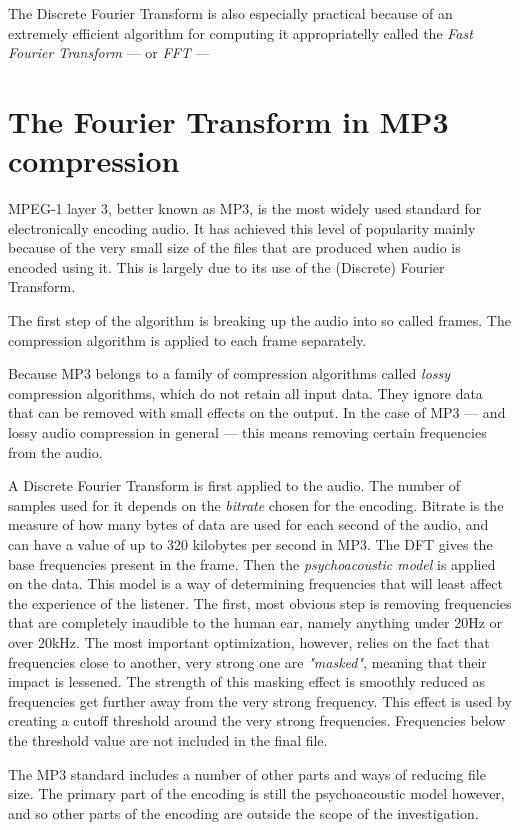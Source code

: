 \documentclass [12pt, titlepage]{article}
\numberwithin{equation}{section}
\let\oldsection\section
\renewcommand\section{\clearpage\oldsection}
\begin{document}
The Discrete Fourier Transform is also especially practical because of an extremely
efficient algorithm for computing it appropriatelly called the \emph{Fast Fourier Transform}
--- or \emph{FFT} --- 
    
\section{The Fourier Transform in MP3 compression}

MPEG-1 layer 3, better known as MP3, is the most widely used standard for electronically
encoding audio. It has achieved this level of popularity mainly because of the very small
size of the files that are produced when audio is encoded using it. This is largely due to
its use of the (Discrete) Fourier Transform. \autocite{mp3_paper}

The first step of the algorithm is breaking up the audio into so called frames. The
compression algorithm is applied to each frame separately.

Because MP3 belongs to a family of compression algorithms called \emph{lossy} compression
algorithms, which do not retain all input data. They ignore data that can be removed with
small effects on the output. In the case of MP3 --- and lossy audio compression in general
--- this means removing certain frequencies from the audio. 

A Discrete Fourier Transform is first applied to the audio. The number of samples used for
it depends on the \emph{bitrate} chosen for the encoding. Bitrate is the measure of how many
bytes of data are used for each second of the audio, and can have a value of up to 320
kilobytes per second in MP3. The DFT gives the base frequencies present in the frame. Then
the \emph{psychoacoustic model} is applied on the data. This model is a way of determining
frequencies that will least affect the experience of the listener. The first, most obvious
step is removing frequencies that are completely inaudible to the human ear, namely anything
under 20Hz or over 20kHz. The most important optimization, however, relies on the fact that
frequencies close to another, very strong one are \emph{"masked"}, meaning that their impact
is lessened. The strength of this masking effect is smoothly reduced as frequencies get
further away from the very strong frequency. This effect is used by creating a cutoff
threshold around the very strong frequencies. Frequencies below the threshold value are
not included in the final file. 

The MP3 standard includes a number of other parts and ways of reducing file size. The
primary part of the encoding is still the psychoacoustic model however, and so other parts
of the encoding are outside the scope of the investigation.

\printbibliography
\end{document}
